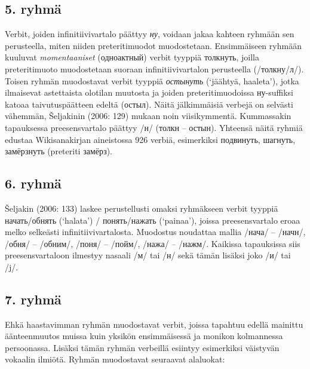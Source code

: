 \documentclass[]{scrartcl}
\begin{document}
\subsection*{5. ryhmä}\label{ryhmuxe4-4}

Verbit, joiden infinitiivivartalo päättyy \emph{ну}, voidaan jakaa
kahteen ryhmään sen perusteella, miten niiden preteritimuodot
muodostetaan. Ensimmäiseen ryhmään kuuluvat \emph{momentaaniset}
(одноактный) verbit tyyppiä толкнуть, joilla preteritimuoto muodostetaan
suoraan infinitiivivartalon perusteella (/толкну/л/). Toisen ryhmän
muodostavat verbit tyyppiä \emph{остынуть} (`jäähtyä, haaleta'), jotka
ilmaisevat astettaista olotilan muutosta ja joiden preteritimuodoissa
ну-suffiksi katoaa taivutuspäätteen edeltä (остыл). Näitä jälkimmäisiä
verbejä on selvästi vähemmän, Šeljakinin (2006: 129) mukaan noin
viisikymmentä. Kummassakin tapauksessa preesensvartalo päättyy /н/
(толкн -- остын). Yhteensä näitä ryhmiä edustaa Wikisanakirjan
aineistossa 926 verbiä, esimerkiksi подвинуть, шагнуть, замёрзнуть
(preteriti замёрз).

\subsection*{6. ryhmä}\label{ryhmuxe4-5}

Šeljakin (2006: 133) laskee perustellusti omaksi ryhmäkseen verbit
tyyppiä начать/обнять (`halata') / понять/нажать (`painaa'), joissa
preesensvartalo eroaa melko selkeästi infinitiivivartalosta. Muodostus
noudattaa mallia /нача/ -- /начн/, /обня/ -- /обним/, /поня/ -- /пойм/,
/нажа/ -- /нажм/. Kaikissa tapauksissa siis preesensvartaloon ilmestyy
nasaali /м/ tai /н/ sekä tämän lisäksi joko /и/ tai /j/.

\subsection*{7. ryhmä}\label{ryhmuxe4-6}

Ehkä haastavimman ryhmän muodostavat verbit, joissa tapahtuu edellä
mainittu äänteenmuutos muissa kuin yksikön ensimmäisessä ja monikon
kolmannessa persoonassa. Lisäksi tämän ryhmän verbeillä esiintyy
esimerkiksi väistyvän vokaalin ilmiötä. Ryhmän muodostavat seuraavat
alaluokat:
\end{document}
